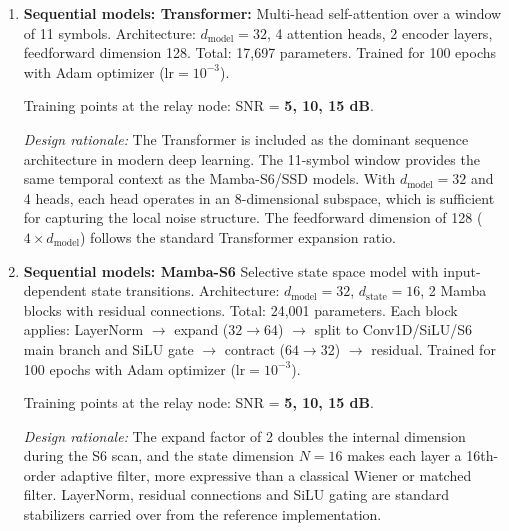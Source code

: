 \begin{enumerate}
  Training points at the relay node: SNR = \textbf{5, 10, 15 dB}.

  \emph{Design rationale:} The high \(\lambda_{\text{L1}} = 100\) ensures that the generator is primarily supervised by the reconstruction loss, with the adversarial term acting as a regularizer that encourages outputs to lie on the clean signal manifold. The noise vector \(\mathbf{z} \in \mathbb{R}^8\) provides the stochastic input needed by the GAN framework. The 5:1 critic-to-generator update ratio follows the WGAN-GP recommendation for stable critic training. The doubled epoch count (200 vs.~100) compensates for the slower per-step convergence of adversarial training.

\item  \textbf{Sequential models: Transformer:} Multi-head self-attention over a window of 11 symbols. Architecture: \(d_{\text{model}}=32\), 4 attention heads, 2 encoder layers, feedforward dimension 128. Total: 17,697 parameters. Trained for 100 epochs with Adam optimizer (\(\text{lr}=10^{-3}\)).

  Training points at the relay node: SNR = \textbf{5, 10, 15 dB}.

  \emph{Design rationale:} The Transformer is included as the dominant sequence architecture in modern deep learning. The 11-symbol window provides the same temporal context as the Mamba-S6/SSD models. With \(d_{\text{model}} = 32\) and 4 heads, each head operates in an 8-dimensional subspace, which is sufficient for capturing the local noise structure. The feedforward dimension of 128 (\(4 \times d_{\text{model}}\)) follows the standard Transformer expansion ratio.
\item  \textbf{Sequential models: Mamba-S6} Selective state space model with input-dependent state transitions. Architecture: \(d_{\text{model}}=32\), \(d_{\text{state}}=16\), 2 Mamba blocks with residual connections. Total: 24,001 parameters. Each block applies: LayerNorm $\to$ expand (\(32 \to 64\)) $\to$ split to Conv1D/SiLU/S6 main branch and SiLU gate $\to$ contract (\(64 \to 32\)) $\to$ residual. Trained for 100 epochs with Adam optimizer (\(\text{lr}=10^{-3}\)).

  Training points at the relay node: SNR = \textbf{5, 10, 15 dB}.

  \emph{Design rationale:} The expand factor of 2 doubles the internal dimension during the S6 scan, and the state dimension $N=16$ makes each layer a 16th-order adaptive filter, more expressive than a classical Wiener or matched filter. LayerNorm, residual connections and SiLU gating are standard stabilizers carried over from the reference implementation.


\end{enumerate}
